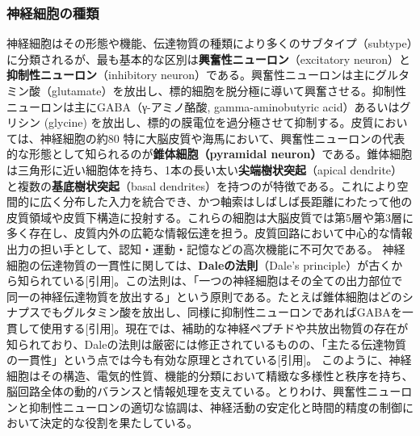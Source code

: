 \subsubsection{神経細胞の種類}
神経細胞はその形態や機能、伝達物質の種類により多くのサブタイプ（subtype）に分類されるが、最も基本的な区別は\textbf{興奮性ニューロン}（excitatory neuron）と\textbf{抑制性ニューロン}（inhibitory neuron）である。興奮性ニューロンは主にグルタミン酸（glutamate）を放出し、標的細胞を脱分極に導いて興奮させる。抑制性ニューロンは主にGABA（γ-アミノ酪酸, gamma-aminobutyric acid）あるいはグリシン (glycine) を放出し、標的の膜電位を過分極させて抑制する。皮質においては、神経細胞の約80%
特に大脳皮質や海馬において、興奮性ニューロンの代表的な形態として知られるのが\textbf{錐体細胞（pyramidal neuron）}である。錐体細胞は三角形に近い細胞体を持ち、1本の長い太い\textbf{尖端樹状突起}（apical dendrite）と複数の\textbf{基底樹状突起}（basal dendrites）を持つのが特徴である。これにより空間的に広く分布した入力を統合でき、かつ軸索はしばしば長距離にわたって他の皮質領域や皮質下構造に投射する。これらの細胞は大脳皮質では第5層や第3層に多く存在し、皮質内外の広範な情報伝達を担う。皮質回路において中心的な情報出力の担い手として、認知・運動・記憶などの高次機能に不可欠である。
神経細胞の伝達物質の一貫性に関しては、\textbf{Daleの法則}（Dale’s principle）が古くから知られている[引用]。この法則は、「一つの神経細胞はその全ての出力部位で同一の神経伝達物質を放出する」という原則である。たとえば錐体細胞はどのシナプスでもグルタミン酸を放出し、同様に抑制性ニューロンであればGABAを一貫して使用する[引用]。現在では、補助的な神経ペプチドや共放出物質の存在が知られており、Daleの法則は厳密には修正されているものの、「主たる伝達物質の一貫性」という点では今も有効な原理とされている[引用]。
このように、神経細胞はその構造、電気的性質、機能的分類において精緻な多様性と秩序を持ち、脳回路全体の動的バランスと情報処理を支えている。とりわけ、興奮性ニューロンと抑制性ニューロンの適切な協調は、神経活動の安定化と時間的精度の制御において決定的な役割を果たしている。
